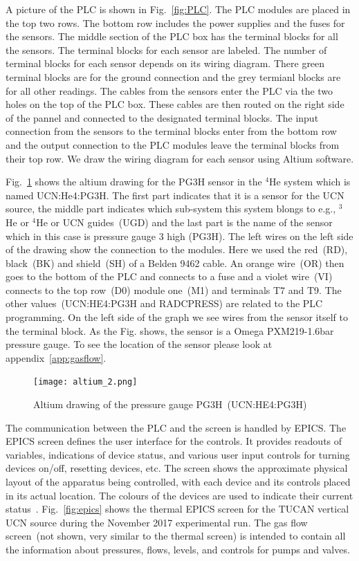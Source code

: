 A picture of the PLC is shown in Fig.~\ref{fig:PLC}. The PLC modules
are placed in the top two rows. The bottom row includes the power
supplies and the fuses for the sensors. The middle section of the PLC
box has the terminal blocks for all the sensors. The terminal blocks
for each sensor are labeled. The number of terminal blocks for each
sensor depends on its wiring diagram. There green terminal blocks are
for the ground connection and the grey termianl blocks are for all
other readings.  The cables from the sensors enter the PLC via the two
holes on the top of the PLC box. These cables are then routed on the
right side of the pannel and connected to the designated terminal
blocks. The input connection from the sensors to the terminal blocks
enter from the bottom row and the output connection to the PLC modules
leave the terminal blocks from their top row. We draw the wiring
diagram for each sensor using Altium software.

Fig.~\ref{fig:altium} shows the altium drawing for the PG3H sensor in
the $^4$He system which is named UCN:He4:PG3H. The first part
indicates that it is a sensor for the UCN source, the middle part
indicates which sub-system this system blongs to e.g., $^3$He or
$^4$He or UCN guides~(UGD) and the last part is the name of the sensor
which in this case is pressure gauge 3 high (PG3H). The left wires on
the left side of the drawing show the connection to the modules. Here
we used the red~(RD), black~(BK) and shield~(SH) of a Belden 9462
cable. An orange wire~(OR) then goes to the bottom of the PLC and
connects to a fuse and a violet wire~(VI) connects to the top row~(D0)
module one~(M1) and terminals T7 and T9. The other
values~(UCN:HE4:PG3H and RADCPRESS) are related to the PLC
programming. On the left side of the graph we see wires from the
sensor itself to the terminal block. As the Fig. shows, the sensor is
a Omega PXM219-1.6bar pressure gauge. To see the location of the
sensor please look at appendix~\ref{app:gasflow}.

\begin{figure}[h!]
  \centering
  \texttt{[image: altium\_2.png]}
  \caption{Altium drawing of the pressure gauge PG3H~(UCN:HE4:PG3H) }
  \label{fig:altium}
\end{figure}



The communication between the PLC and the screen is handled by EPICS.
The EPICS screen defines the user interface for the controls. It
provides readouts of variables, indications of device status, and
various user input controls for turning devices on/off, resetting
devices, etc. The screen shows the approximate physical layout of the
apparatus being controlled, with each device and its controls placed
in its actual location. The colours of the devices are used to
indicate their current status~\cite{Sean_manual}. Fig.~\ref{fig:epics}
shows the thermal EPICS screen for the TUCAN vertical UCN source
during the November 2017 experimental run. The gas flow screen~(not
shown, very similar to the thermal screen) is intended to contain all
the information about pressures, flows, levels, and controls for pumps and
valves.

